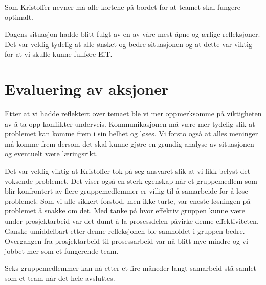 Som Kristoffer nevner må alle kortene på bordet for at teamet skal fungere optimalt. 

Dagens situasjon hadde blitt fulgt av en av våre mest åpne og ærlige refleksjoner. Det var veldig tydelig at
alle ønsket og bedre situasjonen og at dette var viktig for at vi skulle kunne fullføre EiT. 

\section{Evaluering av aksjoner}

Etter at vi hadde reflektert over temaet ble vi mer oppmerksomme på viktigheten av å ta opp konflikter underveis.
Kommunikasjonen må være mer tydelig slik at problemet kan komme frem i sin helhet og løses. 
Vi forsto også at alles meninger må komme frem dersom det skal kunne gjøre en grundig analyse av situasjonen
og eventuelt være læringsrikt. 

Det var veldig viktig at Kristoffer tok på seg ansvaret slik at vi fikk belyst det voksende problemet.
Det viser også en sterk egenskap når et gruppemedlem som blir konfrontert av flere gruppemedlemmer er villig til 
å samarbeide for å løse problemet. 
Som vi alle sikkert forstod, men ikke turte, var eneste løsningen på problemet å snakke om det. 
Med tanke på hvor effektiv gruppen kunne være under prosjektarbeid var det dumt å la prosessdelen påvirke
denne effektiviteten. Ganske umiddelbart etter denne refleksjonen ble samholdet i gruppen bedre.
Overgangen fra prosjektarbeid til prosessarbeid var nå blitt mye mindre og vi jobbet mer som et fungerende team.

Seks gruppemedlemmer kan nå etter et fire måneder langt samarbeid stå samlet som et team når det hele avsluttes.